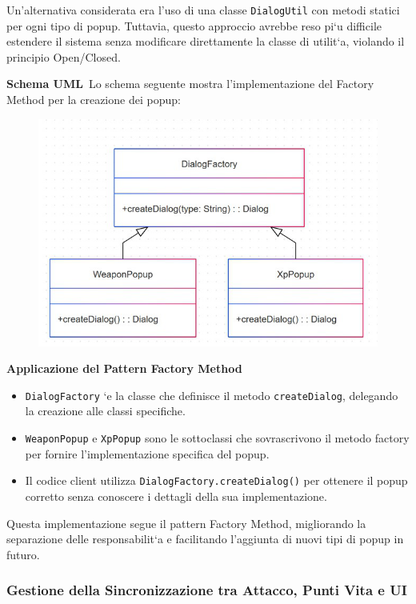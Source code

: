 \documentclass[a4paper,12pt]{report}
\begin{document}
Un’alternativa considerata era l’uso di una classe \texttt{DialogUtil} con metodi statici per ogni tipo di popup. Tuttavia, questo approccio avrebbe reso pi`u difficile estendere il sistema senza modificare direttamente la classe di utilit`a, violando il principio Open/Closed.

\textbf{Schema UML}\
Lo schema seguente mostra l'implementazione del Factory Method per la creazione dei popup:

\begin{figure}[H]
	\includegraphics[scale=0.8]{img/montanariDialog.png}
\end{figure}

\textbf{Applicazione del Pattern Factory Method}\
\begin{itemize}
\item \texttt{DialogFactory} `e la classe che definisce il metodo \texttt{createDialog}, delegando la creazione alle classi specifiche.
\item \texttt{WeaponPopup} e \texttt{XpPopup} sono le sottoclassi che sovrascrivono il metodo factory per fornire l’implementazione specifica del popup.
\item Il codice client utilizza \texttt{DialogFactory.createDialog()} per ottenere il popup corretto senza conoscere i dettagli della sua implementazione.
\end{itemize}

Questa implementazione segue il pattern Factory Method, migliorando la separazione delle responsabilit`a e facilitando l’aggiunta di nuovi tipi di popup in futuro.

\subsubsection{Gestione della Sincronizzazione tra Attacco, Punti Vita e UI}
\end{document}
